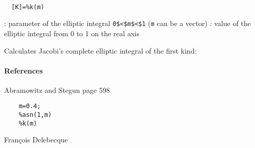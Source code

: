 
\begin{mandesc}
   \\ %
\end{mandesc}
\begin{calling_sequence}
\begin{verbatim}
  [K]=%k(m)  
\end{verbatim}
\end{calling_sequence}
\begin{parameters}
  \begin{varlist}
    : parameter of the elliptic integral \verb!0$<$m$<$1! (\verb!m! can be a vector)
    : value of the elliptic integral from 0 to 1 on the real axis
  \end{varlist}
\end{parameters}
\begin{mandescription}
  Calculates Jacobi's complete elliptic integral
  of the first kind:
\end{mandescription}
\paragraph{References}
Abramowitz and Stegun page 598
\begin{examples}
  \begin{Verbatim}
    m=0.4;
    %asn(1,m)
    %k(m)
  \end{Verbatim}
\end{examples}
\begin{manseealso}
\end{manseealso}
\begin{authors}
  Fran\c{c}ois Delebecque  
\end{authors}
